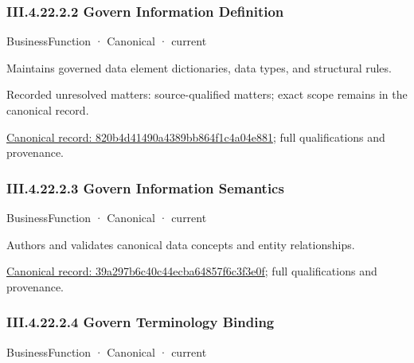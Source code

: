 \subsubsection*{III.4.22.2.2 Govern Information Definition}
\label{navigation:III.4.22.2.2}

\label{element:820b4d41490a4389bb864f1c4a04e881}
{\small BusinessFunction · Canonical · current}\par

Maintains governed data element dictionaries, data types, and structural rules.


{\small Recorded unresolved matters: source-qualified matters; exact scope remains in the canonical record.}\par
{\footnotesize \href{../../../../continuum/business/business-function/820b4d41490a4389bb864f1c4a04e881.md}{Canonical record: 820b4d41490a4389bb864f1c4a04e881}; full qualifications and provenance.}\par
\subsubsection*{III.4.22.2.3 Govern Information Semantics}
\label{navigation:III.4.22.2.3}

\label{element:39a297b6c40c44ecba64857f6c3f3e0f}
{\small BusinessFunction · Canonical · current}\par

Authors and validates canonical data concepts and entity relationships.


{\footnotesize \href{../../../../continuum/business/business-function/39a297b6c40c44ecba64857f6c3f3e0f.md}{Canonical record: 39a297b6c40c44ecba64857f6c3f3e0f}; full qualifications and provenance.}\par
\subsubsection*{III.4.22.2.4 Govern Terminology Binding}
\label{navigation:III.4.22.2.4}

\label{element:9e96ce12b7494594a6129f79f7491223}
{\small BusinessFunction · Canonical · current}\par


